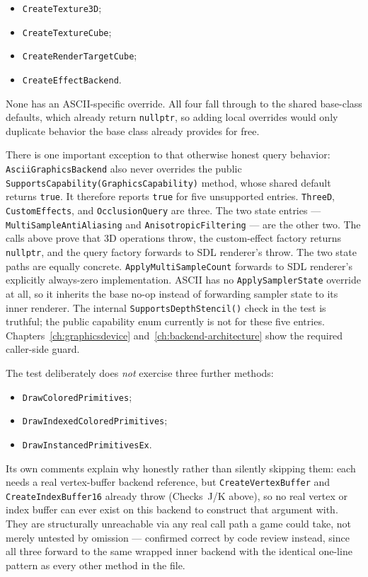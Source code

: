 \begin{itemize}[nosep]
  \item \texttt{CreateTexture3D};
  \item \texttt{CreateTextureCube};
  \item \texttt{CreateRenderTargetCube};
  \item \texttt{CreateEffectBackend}.
\end{itemize}

None has an ASCII-specific override. All four fall through to the shared base-class defaults,
which already return \texttt{nullptr}, so adding local overrides would only duplicate
behavior the base class already provides for free.

There is one important exception to that otherwise honest query behavior:
\texttt{AsciiGraphics}\allowbreak\texttt{Backend} also never overrides the public
\texttt{SupportsCapability(GraphicsCapability)} method, whose shared default returns
\texttt{true}. It therefore reports \texttt{true} for five unsupported entries.
\texttt{ThreeD}, \texttt{CustomEffects}, and \texttt{OcclusionQuery} are three.
The two state entries --- \texttt{MultiSample}\allowbreak\texttt{AntiAliasing} and
\texttt{Anisotropic}\allowbreak\texttt{Filtering} --- are the other two.
The calls above prove that 3D operations throw, the custom-effect
factory returns \texttt{nullptr}, and the query factory forwards to SDL renderer's throw.
The two state paths are equally concrete.
\texttt{ApplyMultiSample}\allowbreak\texttt{Count} forwards to SDL renderer's explicitly
always-zero implementation. ASCII has no
\texttt{ApplySampler}\allowbreak\texttt{State} override at all, so it inherits the base no-op
instead of forwarding sampler state to its inner renderer. The internal
\texttt{SupportsDepthStencil()} check in the test is truthful; the public capability enum
currently is not for these five entries. Chapters~\ref{ch:graphicsdevice}
and~\ref{ch:backend-architecture} show the required caller-side guard.

The test deliberately does \emph{not} exercise three further methods:

\begin{itemize}[nosep]
  \item \texttt{DrawColoredPrimitives};
  \item \texttt{DrawIndexedColoredPrimitives};
  \item \texttt{DrawInstancedPrimitivesEx}.
\end{itemize}

Its own comments explain why honestly rather than silently skipping them: each needs a real
vertex-buffer backend reference, but \texttt{CreateVertexBuffer} and
\texttt{CreateIndexBuffer16} already throw (Checks~J/K above), so no real vertex or index
buffer can ever exist on this backend to construct that argument with. They are structurally
unreachable via any real call path a game could take, not merely untested by omission ---
confirmed correct by code review instead, since all three forward to the same wrapped inner
backend with the identical one-line pattern as every other method in the file.

